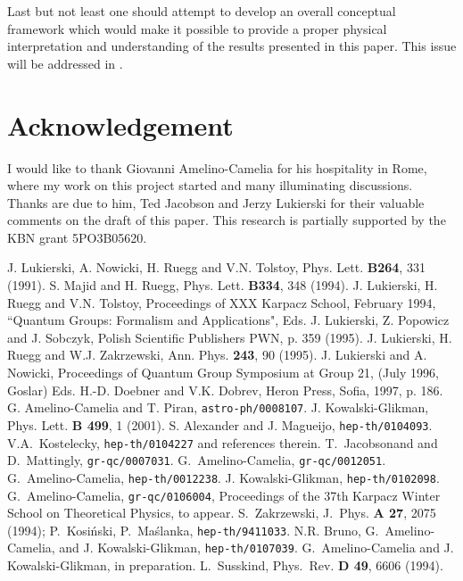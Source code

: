 \documentclass[a4paper,a4paper]{article}
\begin{document}
Last but not least one should attempt to develop an overall conceptual framework which would make it possible to provide a proper physical interpretation and understanding of the results presented in this paper. This issue will be addressed in \cite{gacjkgfut}.










\section*{Acknowledgement} I would like to thank  Giovanni Amelino-Camelia for his hospitality in Rome, where my work on this project started  and many illuminating discussions. Thanks are due to him, Ted Jacobson and Jerzy Lukierski for their valuable comments on the draft of this paper. This research is partially supported by the   KBN grant 5PO3B05620.


\begin{thebibliography}{99}
 J. Lukierski, A. Nowicki, H. Ruegg and V.N. Tolstoy,
Phys. Lett.  {\bf B264}, 331 (1991).
 S. Majid and H. Ruegg, Phys. Lett. {\bf B334},
348 (1994).
 J. Lukierski, H. Ruegg and V.N. Tolstoy,
Proceedings of XXX Karpacz School, February 1994, ``Quantum
Groups: Formalism and Applications", Eds. J. Lukierski,
 Z. Popowicz and J. Sobczyk, Polish Scientific Publishers PWN,
p. 359 (1995).
 J. Lukierski, H. Ruegg and W.J. Zakrzewski, Ann.
Phys. {\bf 243}, 90 (1995).
 J. Lukierski and A. Nowicki, Proceedings of
Quantum Group Symposium at Group 21, (July 1996, Goslar) Eds.
H.-D. Doebner and V.K. Dobrev, Heron Press, Sofia, 1997, p. 186.
 G. Amelino-Camelia and T. Piran, {\tt astro-ph/0008107}.
 J. Kowalski-Glikman, Phys. Lett. {\bf B 499}, 1 (2001).
 S. Alexander and J. Magueijo, {\tt hep-th/0104093}.
 V.A.~Kostelecky, {\tt hep-th/0104227} and references therein.
 T.~Jacobsonand and D.~Mattingly, {\tt gr-qc/0007031}.
 G.~Amelino-Camelia, {\tt gr-qc/0012051}.
 G.~Amelino-Camelia, {\tt hep-th/0012238}.
 J. Kowalski-Glikman, {\tt hep-th/0102098}.
 G.~Amelino-Camelia, {\tt gr-qc/0106004}, Proceedings of the 37th Karpacz Winter School on Theoretical Physics, to appear.
 S.~Zakrzewski, J.~Phys.  {\bf A 27}, 2075 (1994); P.~Kosi\'{n}ski, P.~Ma\'{s}lanka, {\tt hep-th/9411033}.
 N.R. Bruno, G.~Amelino-Camelia, and J. Kowalski-Glikman, {\tt hep-th/0107039}.
  G.~Amelino-Camelia and J. Kowalski-Glikman, in preparation.
 L.~Susskind, Phys.~Rev. {\bf D 49}, 6606 (1994).
\end{thebibliography}
\end{document}

